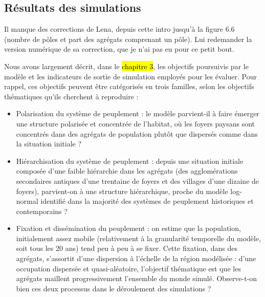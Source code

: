 \clearpage
\subsection{Résultats des simulations \label{subsec:resultats}}

\begin{tcolorbox}[breakable,left=0pt,right=0pt,top=0pt,bottom=0pt,
	colback=yellow!50,colframe=black,width=\dimexpr\textwidth\relax, 
	enlarge left by=0mm, boxsep=5pt,arc=0pt,outer arc=0pt]
Il manque des corrections de Lena, depuis cette intro jusqu'à la figure 6.6 (nombre de pôles et part des agrégats comprenant un pôle).
Lui redemander la version numérique de sa correction, que je n'ai pas eu pour ce petit bout.
\end{tcolorbox}



Nous avons largement décrit, dans le \hl{chapitre 3}, les objectifs poursuivis par le modèle et les indicateurs de sortie de simulation employés pour les évaluer.
Pour rappel, ces objectifs peuvent être catégorisés en trois familles, selon les objectifs thématiques qu'ils cherchent à reproduire : 
\begin{itemize}
	\item Polarisation du système de peuplement : le modèle parvient-il à faire émerger une structure polarisée et concentrée de l'habitat, où les foyers paysans sont concentrés dans des agrégats de population plutôt que dispersés comme dans la situation initiale ?
	\item Hiérarchisation du système de peuplement : depuis une situation initiale composée d'une faible hiérarchie dans les agrégats (des \og agglomérations secondaires antiques\fg{} d'une trentaine de foyers et des \og villages\fg{} d'une dizaine de foyers), parvient-on à une structure hiérarchique, proche du modèle log-normal identifié dans la majorité des systèmes de peuplement historiques et contemporains ?
	\item Fixation et dissémination du peuplement : on estime que la population, initialement assez mobile (relativement à la granularité temporelle du modèle, soit tous les 20 ans) tend peu à peu à se fixer.
	Cette fixation, dans des agrégats, s'assortit d'une dispersion à l'échelle de la région modélisée : d'une occupation dispersée et quasi-aléatoire, l'objectif thématique est que les agrégats maillent progressivement l'ensemble du monde simulé.
	Observe-t-on bien ces deux processus dans le déroulement des simulations ?
\end{itemize}

